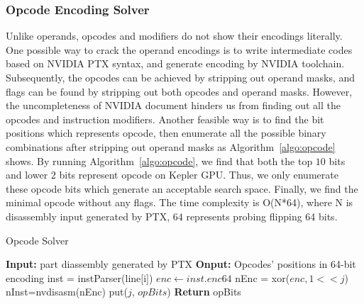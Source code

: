 
\subsubsection{Opcode Encoding Solver}
Unlike operands, opcodes and modifiers do not show their encodings literally. One possible way to crack the operand 
encodings is to write intermediate codes
based on NVIDIA PTX syntax, and generate encoding by NVIDIA toolchain.
Subsequently, the opcodes can be achieved by stripping out operand masks, and
flags can be found by stripping out both opcodes and operand masks.
However, the uncompleteness of NVIDIA document hinders us from finding out all the opcodes and instruction modifiers. 
Another feasible way is to find the bit positions which represents opcode, then
enumerate all the possible binary combinations after stripping out operand masks as Algorithm~\ref{algo:opcode} shows.
By running Algorithm~\ref{algo:opcode}, we find that both the top $10$ bits and lower $2$ bits represent opcode on Kepler GPU.
Thus, we only enumerate these opcode bits which generate an acceptable search space. Finally, we find 
the minimal opcode without any flags. The time complexity is O(N*64), where N
is disassembly input generated by PTX, $64$ represents probing flipping 64
bits.

\begin{algorithm}[htbp]
      \caption{Opcode Solver}\label{algo:opcode}
  \begin{algorithmic}[1]
      \State \textbf {Input:} part diassembly generated by PTX
      \State \textbf {Onput:} Opcodes' positions in 64-bit encoding
      \State inst = instParser(line[i])
      \State $enc \gets inst.enc64$
      \State nEnc = xor($enc, 1<<j$)
      \State nInst=nvdisasm(nEnc)
      \State put($j$, $opBits$)
      \EndIf
      \EndFor
      \EndFor
      \State \textbf{Return} opBits %
  \end{algorithmic}
\end{algorithm}

